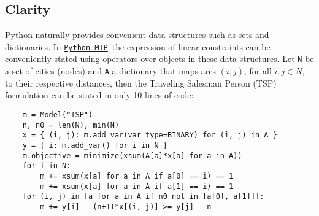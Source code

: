 \documentclass{article}
\def\PythonMIP{\href{https://github.com/coin-or/python-mip}{\texttt{Python-MIP}}}
\begin{document}
\subsection{Clarity}
Python naturally provides convenient data structures such as sets and dictionaries. 
In \PythonMIP\ the expression of linear constraints can be conveniently stated using operators over objects in these data structures. 
Let \texttt{N} be a set of cities (nodes) and \texttt{A} a dictionary that maps arcs $(i,j)$, for all $i,j\in N$, to their respective distances, then the Traveling Salesman Person (TSP) formulation \cite{Miller1960} can be stated in only 10 lines of code:

\begin{verbatim}
    m = Model("TSP")
    n, n0 = len(N), min(N)
    x = { (i, j): m.add_var(var_type=BINARY) for (i, j) in A }
    y = { i: m.add_var() for i in N }
    m.objective = minimize(xsum(A[a]*x[a] for a in A))
    for i in N:
        m += xsum(x[a] for a in A if a[0] == i) == 1
        m += xsum(x[a] for a in A if a[1] == i) == 1
    for (i, j) in [a for a in A if n0 not in [a[0], a[1]]]:
        m += y[i] - (n+1)*x[(i, j)] >= y[j] - n
\end{verbatim}
\end{document}
